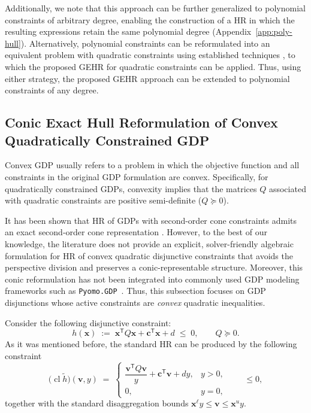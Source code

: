 \documentclass[11pt]{article}
\begin{document}
Additionally, we note that this approach can be further generalized to polynomial constraints of arbitrary degree, enabling the construction of a HR in which the resulting expressions retain the same polynomial degree (Appendix~\ref{app:poly-hull}).
Alternatively, polynomial constraints can be reformulated into an equivalent problem with quadratic constraints using established techniques \cite{kariaAssessmentTwostepApproach2022}, to which the proposed GEHR for quadratic constraints can be applied.
Thus, using either strategy, the proposed GEHR approach can be extended to polynomial constraints of any degree.




\subsection{Conic Exact Hull Reformulation of Convex Quadratically Constrained GDP}
\label{sec:conic-gdp}
Convex GDP usually refers to a problem in which the objective function and all constraints in the original GDP formulation are convex.
Specifically, for quadratically constrained GDPs, convexity implies that the matrices \(Q\)  associated with quadratic constraints are positive semi-definite (\(Q \succeq 0 \)). 

It has been shown that HR of GDPs with second-order cone constraints admits an exact second-order cone representation \cite{bernalneiraConvexMixedintegerNonlinear2024}.
However, to the best of our knowledge, the literature does not provide an explicit, solver-friendly algebraic formulation for HR of convex quadratic disjunctive constraints that avoids the perspective division and preserves a conic-representable structure.
Moreover, this conic reformulation has not been integrated into commonly used GDP modeling frameworks such as \texttt{Pyomo.GDP}~\cite{chenPyomoGDPEcosystemLogic2022}.
Thus, this subsection focuses on GDP disjunctions whose active constraints are \emph{convex} quadratic
inequalities. 



Consider the following disjunctive constraint:
\begin{equation}
\label{eq:convex-q-gdp}
    h(\mathbf x)
    \;:=\;
    \mathbf x^{\mathsf T}Q\mathbf x
    + \mathbf c^{\mathsf T}\mathbf x
    + d
    \;\le\;0,
    \qquad
    Q\succeq 0 .
\end{equation}
As it was mentioned before, the standard HR can be produced by the following constraint
\begin{equation}
\label{eq:convex-perspective}
    \bigl(\operatorname{cl}\widetilde h\bigr)(\mathbf v,y)
    \;=\;
    \begin{cases}
        \dfrac{\mathbf v^{\mathsf T}Q\mathbf v}{y}
        +\mathbf c^{\mathsf T}\mathbf v
        +dy, & y>0,\\[6pt]
        0, & y=0,
    \end{cases}
    \qquad \le 0,
\end{equation}
together with the standard disaggregation bounds
$\mathbf x^{\ell}y\le \mathbf v\le \mathbf x^u y$.
\end{document}
